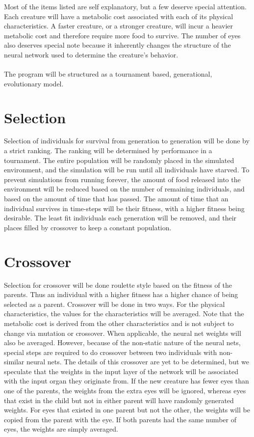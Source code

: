 Most of the items listed are self explanatory, but a few deserve special attention. Each creature will have a metabolic cost associated with each of its physical characteristics. A faster creature, or a stronger creature, will incur a heavier metabolic cost and therefore require more food to survive. The number of eyes also deserves special note because it inherently changes the structure of the neural network used to determine the creature's behavior.
\\
\\
The program will be structured as a tournament based, generational, evolutionary model.

\section{Selection}

Selection of individuals for survival from generation to generation will be done by a strict ranking. The ranking will be determined by performance in a tournament. The entire population will be randomly placed in the simulated environment, and the simulation will be run until all individuals have starved. To prevent simulations from running forever, the amount of food released into the environment will be reduced based on the number of remaining individuals, and based on the amount of time that has passed. The amount of time that an individual survives in time-steps will be their fitness, with a higher fitness being desirable. The least fit individuals each generation will be removed, and their places filled by crossover to keep a constant population.

\section{Crossover}

Selection for crossover will be done roulette style based on the fitness of the parents. Thus an individual with a higher fitness has a higher chance of being selected as a parent. Crossover will be done in two ways. For the physical characteristics, the values for the characteristics will be averaged. Note that the metabolic cost is derived from the other characteristics and is not subject to change via mutation or crossover. When applicable, the neural net weights will also be averaged. However, because of the non-static nature of the neural nets, special steps are required to do crossover between two individuals with non-similar neural nets. The details of this crossover are yet to be determined, but we speculate that the weights in the input layer of the network will be associated with the input organ they originate from. If the new creature has fewer eyes than one of the parents, the weights from the extra eyes will be ignored, whereas eyes that exist in the child but not in either parent will have randomly generated weights. For eyes that existed in one parent but not the other, the weights will be copied from the parent with the eye. If both parents had the same number of eyes, the weights are simply averaged.

